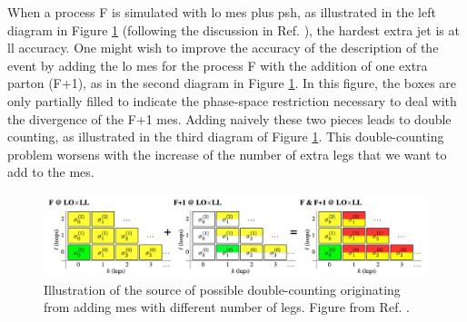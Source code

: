 When a process F is simulated with \gls{lo} \glspl{me} plus \gls{psh}, as illustrated in the left diagram in Figure \ref{fig:sim:matching} (following the discussion in Ref. \cite{Skands:2011pf}), the hardest extra jet is at \gls{ll} accuracy. 
One might wish to improve the accuracy of the description of the event by adding the \gls{lo} \glspl{me} for the process F with the addition of one extra parton (F+1), as in the second diagram in Figure \ref{fig:sim:matching}. In this figure, the boxes are only partially filled to indicate the phase-space restriction necessary to deal with the divergence of the F+1 \glspl{me}. Adding naively these two pieces leads to double counting, as illustrated in the third diagram of Figure \ref{fig:sim:matching}. 
This double-counting problem worsens with the increase of the number of extra legs that we want to add to the \glspl{me}.

\begin{figure}[h]
\begin{center}
    \includegraphics[width=\textwidth]{figures/simul/matching}
\end{center}
\caption{Illustration of the source of possible double-counting originating from adding \glspl{me} with different number of legs. Figure from Ref. \cite{Skands:2011pf}.}
 \label{fig:sim:matching}
\end{figure}

